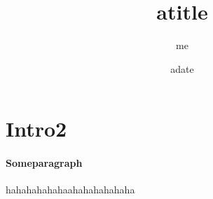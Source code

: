\documentclass{article}
\author{me}
\title{atitle}
\date{adate}
\begin{document}
\maketitle%
\section{Intro2}
\paragraph{Someparagraph}
\par{hahahahahahaahahahahahaha}
\end{document}

